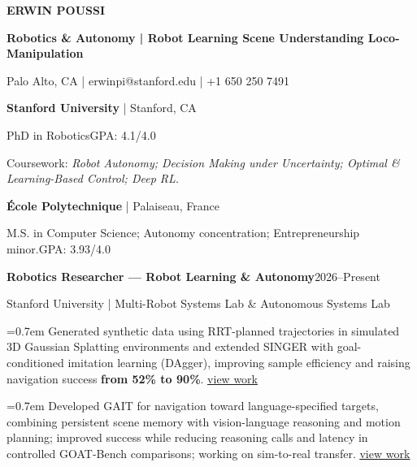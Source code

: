 \documentclass[10pt,letterpaper]{article}
\begin{document}
\fontsize{10}{11}\selectfont
{\fontsize{15}{17}\selectfont\color{navy}\textbf{ERWIN POUSSI}}\par
\textbf{Robotics \& Autonomy | Robot Learning \textbullet{} Scene Understanding \textbullet{} Loco-Manipulation}\par
Palo Alto, CA  |  erwinpi@stanford.edu  |  +1 650 250 7491\par
{}\par\vspace{1pt}{\color{navy!40}\hrule}\vspace{2pt}
\vspace{2pt}\textbf{Stanford University} | Stanford, CA\par
PhD in Robotics\hfill GPA: 4.1/4.0\par
Coursework: \textit{Robot Autonomy; Decision Making under Uncertainty; Optimal \& Learning-Based Control; Deep RL.}\par
\vspace{2pt}\textbf{École Polytechnique} | Palaiseau, France\par
M.S. in Computer Science; Autonomy concentration; Entrepreneurship minor.\hfill GPA: 3.93/4.0\par
{}\par\vspace{1pt}{\color{navy!40}\hrule}\vspace{2pt}
\vspace{2pt}\textbf{Robotics Researcher --- Robot Learning \& Autonomy}\hfill 2026--Present\par
Stanford University | Multi-Robot Systems Lab \& Autonomous Systems Lab\par
\hangindent=0.7em \textbullet{} Generated synthetic data using RRT-planned trajectories in simulated 3D Gaussian Splatting environments and extended SINGER with goal-conditioned imitation learning (DAgger), improving sample efficiency and raising navigation success \textbf{from 52\% to 90\%}. \href{https://rwin2.github.io/erwinpoussi.github.io/project/language-steered-drones/}{\underline{view work}}\par
\hangindent=0.7em \textbullet{} Developed GAIT for navigation toward language-specified targets, combining persistent scene memory with vision-language reasoning and motion planning; improved success while reducing reasoning calls and latency in controlled GOAT-Bench comparisons; working on sim-to-real transfer. \href{https://rwin2.github.io/erwinpoussi.github.io/project/gait/}{\underline{view work}}\par
\end{document}
